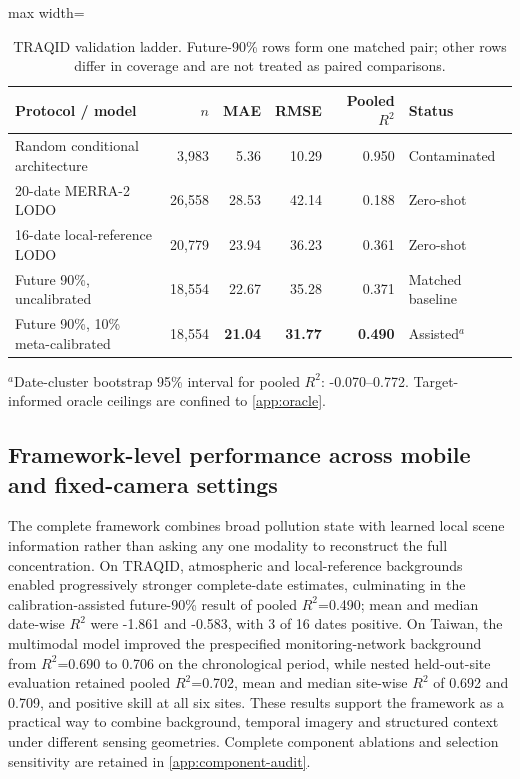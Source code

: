 \documentclass[review,12pt,authoryear]{elsarticle}
\newcommand{\Rtwo}{\ensuremath{R^2}}
\begin{document}
\begin{table}[H]
\centering
\caption{TRAQID validation ladder. Future-90\% rows form one matched pair;
other rows differ in coverage and are not treated as paired comparisons.}
\label{tab:main}
\begin{adjustbox}{max width=\textwidth}
\begin{tabular}{lrrrrl}
\toprule
Protocol / model & $n$ & MAE & RMSE & Pooled \Rtwo & Status \\
\midrule
Random conditional architecture & 3,983 & 5.36 & 10.29 & 0.950 & Contaminated \\
20-date MERRA-2 LODO & 26,558 & 28.53 & 42.14 & 0.188 & Zero-shot \\
16-date local-reference LODO & 20,779 & 23.94 & 36.23 & 0.361 & Zero-shot \\
Future 90\%, uncalibrated & 18,554 & 22.67 & 35.28 & 0.371 & Matched baseline \\
Future 90\%, 10\% meta-calibrated & 18,554 & \textbf{21.04} & \textbf{31.77} & \textbf{0.490} & Assisted$^{a}$ \\
\bottomrule
\end{tabular}
\end{adjustbox}
\vspace{1mm}
\begin{minipage}{0.96\textwidth}\footnotesize
$^{a}$Date-cluster bootstrap 95\% interval for pooled \Rtwo: -0.070--0.772.
Target-informed oracle ceilings are confined to \ref{app:oracle}.
\end{minipage}
\end{table}

\subsection{Framework-level performance across mobile and fixed-camera settings}

The complete framework combines broad pollution state with learned local
scene information rather than asking any one modality to reconstruct the full
concentration. On TRAQID, atmospheric and local-reference backgrounds enabled
progressively stronger complete-date estimates, culminating in the
calibration-assisted future-90\% result of pooled \Rtwo=0.490; mean and median
date-wise \Rtwo{} were -1.861 and -0.583, with 3 of 16 dates positive. On Taiwan, the
multimodal model improved the prespecified monitoring-network background from
\Rtwo=0.690 to 0.706 on the chronological period, while nested held-out-site
evaluation retained pooled \Rtwo=0.702, mean and median site-wise \Rtwo{} of
0.692 and 0.709, and positive skill at all six sites. These
results support the framework as a practical way to combine background,
temporal imagery and structured context under different sensing geometries.
Complete component ablations and selection sensitivity are retained in
\ref{app:component-audit}.
\end{document}

